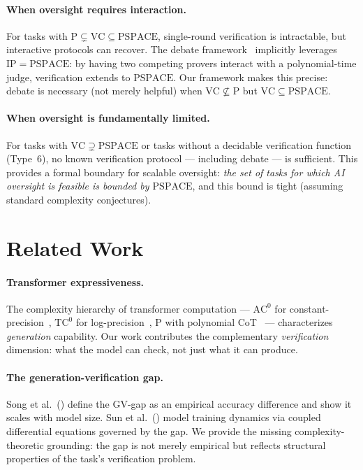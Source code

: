 \documentclass{article}
\theoremstyle{definition}
\theoremstyle{remark}
\newcommand{\TC}{\mathrm{TC}^0}
\newcommand{\AC}{\mathrm{AC}^0}
\newcommand{\PTIME}{\mathrm{P}}
\newcommand{\PSPACE}{\mathrm{PSPACE}}
\newcommand{\IP}{\mathrm{IP}}
\newcommand{\VC}{\mathrm{VC}}           %
\begin{document}
\paragraph{When oversight requires interaction.}
For tasks with $\PTIME \subsetneq \VC \subseteq \PSPACE$, single-round verification is intractable, but interactive protocols can recover.
The debate framework~\citep{irving2018debate,browncohen2024debate} implicitly leverages $\IP = \PSPACE$: by having two competing provers interact with a polynomial-time judge, verification extends to $\PSPACE$.
Our framework makes this precise: debate is necessary (not merely helpful) when $\VC \not\subseteq \PTIME$ but $\VC \subseteq \PSPACE$.

\paragraph{When oversight is fundamentally limited.}
For tasks with $\VC \supsetneq \PSPACE$ or tasks without a decidable verification function (Type~6), no known verification protocol --- including debate --- is sufficient.
This provides a formal boundary for scalable oversight: \emph{the set of tasks for which AI oversight is feasible is bounded by $\PSPACE$}, and this bound is tight (assuming standard complexity conjectures).

\section{Related Work}
\label{sec:related}

\paragraph{Transformer expressiveness.}
The complexity hierarchy of transformer computation --- $\AC$ for constant-precision~\citep{hahn2020theoretical}, $\TC$ for log-precision~\citep{merrill2022saturated}, $\PTIME$ with polynomial CoT~\citep{merrill2024expressive,li2024chain} --- characterizes \emph{generation} capability.
Our work contributes the complementary \emph{verification} dimension: what the model can check, not just what it can produce.

\paragraph{The generation-verification gap.}
Song et al.~(\citeyear{song2024mind}) define the GV-gap as an empirical accuracy difference and show it scales with model size.
Sun et al.~(\citeyear{sun2025solver}) model training dynamics via coupled differential equations governed by the gap.
We provide the missing complexity-theoretic grounding: the gap is not merely empirical but reflects structural properties of the task's verification problem.
\end{document}
